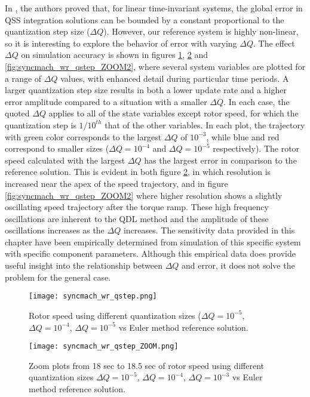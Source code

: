 In \cite{kofman2001b}, the authors proved that, for linear time-invariant systems, the global error in QSS integration solutions can be bounded by a constant proportional to the quantization step size ($\Delta Q$). However, our reference system is highly non-linear, so it is interesting to explore the behavior of error with varying $\Delta Q$. 
The effect $\Delta Q$ on simulation accuracy is shown in figures \ref{fig:syncmach_wr_qstep}, \ref{fig:syncmach_wr_qstep_ZOOM} and \ref{fig:syncmach_wr_qstep_ZOOM2}, where several system variables are plotted for a range of $\Delta Q$ values, with enhanced detail during particular time periods.  A larger quantization step  size results in both a lower update rate and a higher error amplitude compared to a situation with a smaller $\Delta Q$. In each case, the quoted $\Delta Q$ applies to all of the state variables except rotor speed, for which the quantization step is $1/10^{th}$ that of the other variables. In each plot, the trajectory with green color corresponds to the largest $\Delta Q$ of $10^{-3}$, while blue and red correspond to smaller sizes ($\Delta Q = 10^{-4}$  and $\Delta Q = 10^{-5}$ respectively). The rotor speed calculated with the largest $\Delta Q$ has the largest error in comparison to the reference solution. This is evident in both figure \ref{fig:syncmach_wr_qstep_ZOOM}, in which resolution is increased near the apex of the speed trajectory, and in figure \ref{fig:syncmach_wr_qstep_ZOOM2} where higher resolution shows a slightly oscillating speed trajectory after the torque ramp. These high frequency oscillations are inherent to the QDL method and the amplitude of these oscillations increases as the $\Delta Q$ increases. The sensitivity data provided in this chapter have been empirically determined from simulation of this specific system with specific component parameters. Although this empirical data does provide useful insight into the relationship between $\Delta Q$ and error, it does not solve the problem for the general case.

\begin{figure}[h]
    \centering
    \texttt{[image: syncmach\_wr\_qstep.png]}
    \caption{Rotor speed using different quantization sizes ($\Delta Q = 10^{-5}$, $\Delta Q = 10^{-4}$, $\Delta Q = 10^{-5}$ vs Euler method reference solution.}
    \label{fig:syncmach_wr_qstep}
\end{figure}

\begin{figure}[h]
    \centering
    \texttt{[image: syncmach\_wr\_qstep\_ZOOM.png]}
    \caption{Zoom plots from 18 sec to 18.5 sec of rotor speed using different quantization sizes $\Delta Q = 10^{-5}$, $\Delta Q = 10^{-4}$, $\Delta Q = 10^{-3}$ vs Euler method reference solution.}
    \label{fig:syncmach_wr_qstep_ZOOM}
\end{figure}

